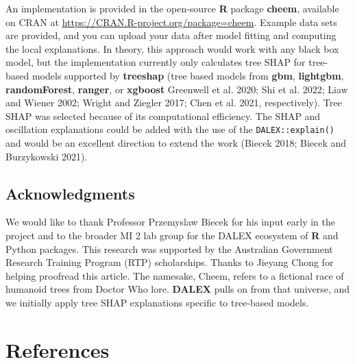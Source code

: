 \documentclass[11pt,twoside]{article}
\begin{document}
An implementation is provided in the open-source \textbf{R} package \textbf{cheem}, available on CRAN at \url{https://CRAN.R-project.org/package=cheem}. Example data sets are provided, and you can upload your data after model fitting and computing the local explanations. In theory, this approach would work with any black box model, but the implementation currently only calculates tree SHAP for tree-based models supported by \textbf{treeshap} (tree based models from \textbf{gbm}, \textbf{lightgbm}, \textbf{randomForest}, \textbf{ranger}, or \textbf{xgboost} Greenwell et al. 2020; Shi et al. 2022; Liaw and Wiener 2002; Wright and Ziegler 2017; Chen et al. 2021, respectively). Tree SHAP was selected because of its computational efficiency. The SHAP and oscillation explanations could be added with the use of the \texttt{DALEX::explain()} and would be an excellent direction to extend the work (Biecek 2018; Biecek and Burzykowski 2021).

\hypertarget{acknowledgments}{%
\subsection*{Acknowledgments}\label{acknowledgments}}

We would like to thank Professor Przemyslaw Biecek for his input early in the project and to the broader MI 2 lab group for the DALEX ecosystem of \textbf{R} and Python packages. This research was supported by the Australian Government Research Training Program (RTP) scholarships. Thanks to Jieyang Chong for helping proofread this article. The namesake, Cheem, refers to a fictional race of humanoid trees from Doctor Who lore. \textbf{DALEX} pulls on from that universe, and we initially apply tree SHAP explanations specific to tree-based models.

\hypertarget{references}{%
\section*{References}\label{references}}
\end{document}
